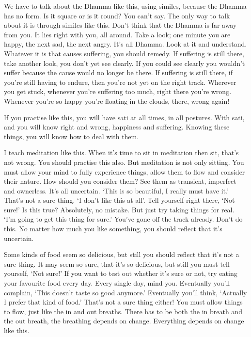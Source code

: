 We have to talk about the Dhamma like this, using similes, because the Dhamma has no form. Is it square or is it round? You can't say. The only way to talk about it is through similes like this. Don't think that the Dhamma is far away from you. It lies right with you, all around. Take a look; one minute you are happy, the next sad, the next angry. It's all Dhamma. Look at it and understand. Whatever it is that causes suffering, you should remedy. If suffering is still there, take another look, you don't yet see clearly. If you could see clearly you wouldn't suffer because the cause would no longer be there. If suffering is still there, if you're still having to endure, then you're not yet on the right track. Wherever you get stuck, whenever you're suffering too much, right there you're wrong. Whenever you're so happy you're floating in the clouds, there, wrong again!

If you practise like this, you will have sati at all times, in all postures. With sati, and  you will know right and wrong, happiness and suffering. Knowing these things, you will know how to deal with them.

I teach meditation like this. When it's time to sit in meditation then sit, that's not wrong. You should practise this also. But meditation is not only sitting. You must allow your mind to fully experience things, allow them to flow and consider their nature. How should you consider them? See them as transient, imperfect and ownerless. It's all uncertain. `This is so beautiful, I really must have it.' That's not a sure thing. `I don't like this at all'. Tell yourself right there, `Not sure!' Is this true? Absolutely, no mistake. But just try taking things for real. `I'm going to get this thing for sure.' You've gone off the track already. Don't do this. No matter how much you like something, you should reflect that it's uncertain.

Some kinds of food seem so delicious, but still you should reflect that it's not a sure thing. It may seem so sure, that it's so delicious, but still you must tell yourself, `Not sure!' If you want to test out whether it's sure or not, try eating your favourite food every day. Every single day, mind you. Eventually you'll complain, `This doesn't taste so good anymore.' Eventually you'll think, `Actually I prefer that kind of food.' That's not a sure thing either! You must allow things to flow, just like the in and out breaths. There has to be both the in breath and the out breath, the breathing depends on change. Everything depends on change like this.

